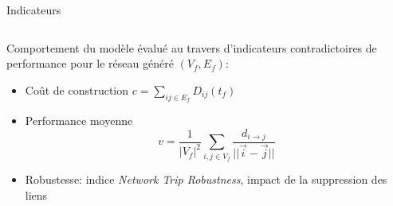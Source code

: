 \documentclass{beamer}
\begin{document}
\begin{frame}{}
\begin{columns}[t]
\begin{column}{.49\textwidth}
        
        \begin{block}{Indicateurs}
       \vspace{-2cm}
        \begin{columns}[t]
        \begin{column}{.95\textwidth}
        \begin{justify}
          Comportement du modèle évalué au travers d'indicateurs contradictoires de performance pour le réseau généré $(V_f,E_f)$:
          \bigskip
          \begin{itemize}
          \item Coût de construction $c=\sum_{ij\in E_f}D_{ij}(t_f)$
          \bigskip
          \item \begin{justify}Performance moyenne~\cite{banos2012towards}
          \[
          v=\frac{1}{|V_f|^2}\sum_{i,j\in V_f}\frac{d_{i\rightarrow j}}{||\vec{i}-\vec{j}||}
          \]
          \end{justify}
          \bigskip
          \item Robustesse: indice \textit{Network Trip Robustness}, impact de la suppression des liens~\cite{sullivan2010identifying}
          \end{itemize}

          \end{justify}
          \end{column}
          \end{columns}
        \end{block}
        

\end{column}
\end{columns}
\end{frame}
\end{document}
